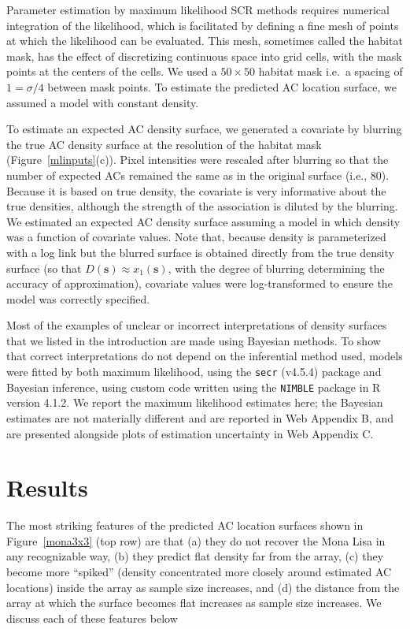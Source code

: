 \documentclass[useAMS,usenatbib,referee]{biom}
\begin{document}
Parameter estimation by maximum likelihood SCR methods requires numerical integration of the likelihood, which is facilitated by defining a fine mesh of points at which the likelihood can be evaluated. This mesh, sometimes called the habitat mask, has the effect of discretizing continuous space into grid cells, with the mask points at the centers of the cells. We used a $50\times 50$ habitat mask i.e.\, a spacing of $1=\sigma/4$ between mask points. To estimate the predicted AC location surface, we assumed a model with constant density. 

To estimate an expected AC density surface, we generated a covariate by blurring the true AC density surface at the resolution of the habitat mask (Figure~\ref{mlinputs}(c)). Pixel intensities were rescaled after blurring so that the number of expected ACs remained the same as in the original surface (i.e., 80). Because it is based on true density, the covariate is very informative about the true densities, although the strength of the association is diluted by the blurring. We estimated an expected AC density surface assuming a model in which density was a function of covariate values. Note that, because density is parameterized with a log link but the blurred surface is obtained directly from the true density surface (so that $D(\mathbf{s})\approx x_1(\mathbf{s})$, with the degree of blurring determining the accuracy of approximation), covariate values were log-transformed to ensure the model was correctly specified.

Most of the examples of unclear or incorrect interpretations of density surfaces that we listed in the introduction are made using Bayesian methods. To show that correct interpretations do not depend on the inferential method used, models were fitted by both maximum likelihood, using the \texttt{secr} (v4.5.4) package \citep{secr:22} and Bayesian inference, using custom code written using the \texttt{NIMBLE} package \citep{deValpine:17, Turek:21} in R version 4.1.2. We report the maximum likelihood estimates here; the Bayesian estimates are not materially different and are reported in Web Appendix B, and are presented alongside plots of estimation uncertainty in Web Appendix C.

\section{Results}
The most striking features of the predicted AC location surfaces shown in Figure~\ref{mona3x3} (top row) are that (a) they do not recover the Mona Lisa in any recognizable way, (b) they predict flat density far from the array, (c) they become more ``spiked'' (density concentrated more closely around estimated AC locations) inside the array as sample size increases, and (d) the distance from the array at which the surface becomes flat increases as sample size increases. We discuss each of these features below
\end{document}
